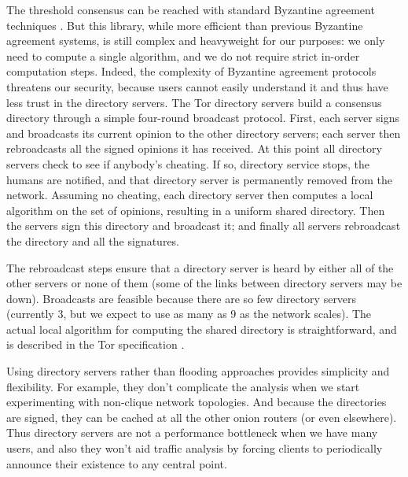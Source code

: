\documentclass[times,10pt,twocolumn]{article}
\begin{document}
The threshold consensus can be reached with standard Byzantine agreement
techniques \cite{castro-liskov}.
But this library, while more efficient than previous Byzantine agreement
systems, is still complex and heavyweight for our purposes: we only need
to compute a single algorithm, and we do not require strict in-order
computation steps. Indeed, the complexity of Byzantine agreement protocols
threatens our security, because users cannot easily understand it and
thus have less trust in the directory servers. The Tor directory servers
build a consensus directory
through a simple four-round broadcast protocol. First, each server signs
and broadcasts its current opinion to the other directory servers; each
server then rebroadcasts all the signed opinions it has received. At this
point all directory servers check to see if anybody's cheating. If so,
directory service stops, the humans are notified, and that directory
server is permanently removed from the network. Assuming no cheating,
each directory server then computes a local algorithm on the set of
opinions, resulting in a uniform shared directory. Then the servers sign
this directory and broadcast it; and finally all servers rebroadcast
the directory and all the signatures.

The rebroadcast steps ensure that a directory server is heard by either
all of the other servers or none of them (some of the links between
directory servers may be down). Broadcasts are feasible because there
are so few directory servers (currently 3, but we expect to use as many
as 9 as the network scales). The actual local algorithm for computing
the shared directory is straightforward, and is described in the Tor
specification \cite{tor-spec}.

Using directory servers rather than flooding approaches provides
simplicity and flexibility. For example, they don't complicate
the analysis when we start experimenting with non-clique network
topologies. And because the directories are signed, they can be cached at
all the other onion routers (or even elsewhere). Thus directory servers
are not a performance bottleneck when we have many users, and also they
won't aid traffic analysis by forcing clients to periodically announce
their existence to any central point.

\end{document}
